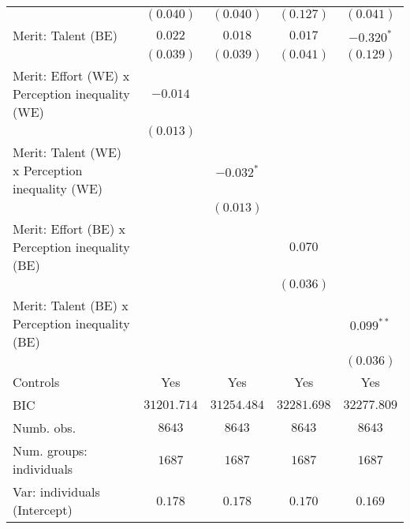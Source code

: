 \documentclass[
  12pt,
]{article}
\begin{document}
\begin{table}
{\begin{center}
{\begin{tabular}{l c c c c}
                                                              & $(0.040)$     & $(0.040)$     & $(0.127)$      & $(0.041)$      \\
Merit: Talent (BE)                                            & $0.022$       & $0.018$       & $0.017$        & $-0.320^{*}$   \\
                                                              & $(0.039)$     & $(0.039)$     & $(0.041)$      & $(0.129)$      \\
Merit: Effort (WE) x Perception inequality (WE)               & $-0.014$      &               &                &                \\
                                                              & $(0.013)$     &               &                &                \\
Merit: Talent (WE) x Perception inequality (WE)               &               & $-0.032^{*}$  &                &                \\
                                                              &               & $(0.013)$     &                &                \\
Merit: Effort (BE) x Perception inequality (BE)               &               &               & $0.070$        &                \\
                                                              &               &               & $(0.036)$      &                \\
Merit: Talent (BE) x Perception inequality (BE)               &               &               &                & $0.099^{**}$   \\
                                                              &               &               &                & $(0.036)$      \\
\hline
Controls                                                      & Yes           & Yes           & Yes            & Yes            \\
BIC                                                           & $31201.714$   & $31254.484$   & $32281.698$    & $32277.809$    \\
Numb. obs.                                                    & $8643$        & $8643$        & $8643$         & $8643$         \\
Num. groups: individuals                                      & $1687$        & $1687$        & $1687$         & $1687$         \\
Var: individuals (Intercept)                                  & $0.178$       & $0.178$       & $0.170$        & $0.169$        \\

\end{tabular}}
\end{center}}
\end{table}
\end{document}
